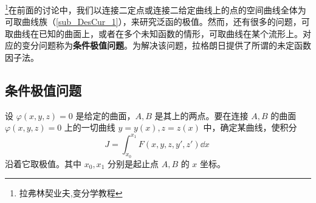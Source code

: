 
\footnote{拉弗林契业夫,变分学教程}在前面的讨论中，我们以连接二定点或连接二给定曲线上的点的空间曲线全体为可取曲线族（\autoref{sub_DesCur_1}），来研究泛函的极值。然而，还有很多的问题，可取曲线在已知的曲面上，或者在多个未知函数的情形，可取曲线在某个流形上。对应的变分问题称为\textbf{条件极值问题}。为解决该问题，拉格朗日提供了所谓的未定函数因子法。
\subsection{条件极值问题}
设 $\varphi(x,y,z)=0$ 是给定的曲面，$A,B$ 是其上的两点。要在连接 $A,B$ 的曲面$\varphi(x,y,z)=0$ 上的一切曲线 $y=y(x),z=z(x)$ 中，确定某曲线，使积分
\begin{equation}\label{eq_CPLM_1}
J=\int_{x_0}^{x_1}F(x,y,z,y',z')\dd x~
\end{equation}
沿着它取极值。其中 $x_0,x_1$ 分别是起止点 $A,B$ 的 $x$ 坐标。
